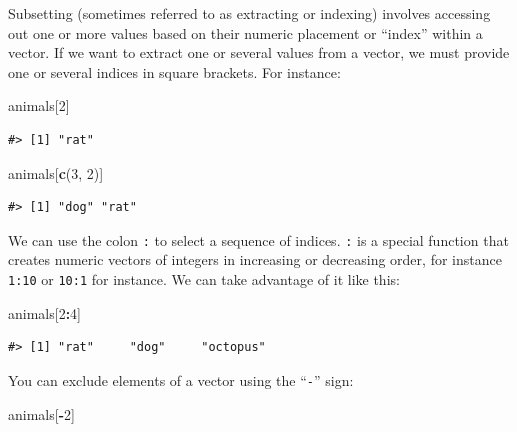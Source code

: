 \documentclass[
]{book}
\newenvironment{Shaded}{\begin{snugshade}}{\end{snugshade}}
\newcommand{\DecValTok}[1]{\textcolor[rgb]{0.00,0.00,0.81}{#1}}
\newcommand{\FunctionTok}[1]{\textcolor[rgb]{0.13,0.29,0.53}{\textbf{#1}}}
\newcommand{\NormalTok}[1]{#1}
\newcommand{\SpecialCharTok}[1]{\textcolor[rgb]{0.81,0.36,0.00}{\textbf{#1}}}
\begin{document}
Subsetting (sometimes referred to as extracting or indexing) involves accessing out one or more values based on their numeric placement or ``index'' within a vector. If we want to extract one or several values from a vector, we must provide one
or several indices in square brackets. For instance:

\begin{Shaded}
\begin{Highlighting}[]
\NormalTok{animals[}\DecValTok{2}\NormalTok{]}
\end{Highlighting}
\end{Shaded}

\begin{verbatim}
#> [1] "rat"
\end{verbatim}

\begin{Shaded}
\begin{Highlighting}[]
\NormalTok{animals[}\FunctionTok{c}\NormalTok{(}\DecValTok{3}\NormalTok{, }\DecValTok{2}\NormalTok{)]}
\end{Highlighting}
\end{Shaded}

\begin{verbatim}
#> [1] "dog" "rat"
\end{verbatim}

We can use the colon \texttt{:} to select a sequence of indices. \texttt{:} is a special function that creates numeric vectors of integers in increasing or decreasing order, for instance \texttt{1:10} or \texttt{10:1} for instance. We can take advantage of it like this:

\begin{Shaded}
\begin{Highlighting}[]
\NormalTok{animals[}\DecValTok{2}\SpecialCharTok{:}\DecValTok{4}\NormalTok{]}
\end{Highlighting}
\end{Shaded}

\begin{verbatim}
#> [1] "rat"     "dog"     "octopus"
\end{verbatim}

You can exclude elements of a vector using the ``\texttt{-}'' sign:

\begin{Shaded}
\begin{Highlighting}[]
\NormalTok{animals[}\SpecialCharTok{{-}}\DecValTok{2}\NormalTok{]}
\end{Highlighting}
\end{Shaded}
\end{document}
